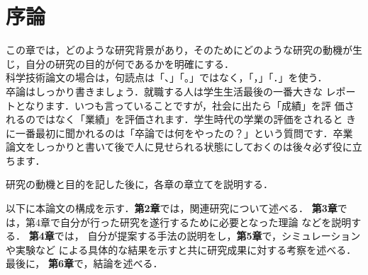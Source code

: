 \chapter{序論}

この章では，どのような研究背景があり，そのためにどのような研究の動機が生
じ，自分の研究の目的が何であるかを明確にする．\\

科学技術論文の場合は，句読点は「、」「。」ではなく，「，」「．」を使う．
\\

卒論はしっかり書きましょう．就職する人は学生生活最後の一番大きな
レポートとなります．いつも言っていることですが，社会に出たら「成績」を評
価されるのではなく「業績」を評価されます．学生時代の学業の評価をされると
きに一番最初に聞かれるのは「卒論では何をやったの？」という質問です．卒業
論文をしっかりと書いて後で人に見せられる状態にしておくのは後々必ず役に立
ちます．\\

\vspace{2cm}

研究の動機と目的を記した後に，各章の章立てを説明する．

\vspace{1cm}
以下に本論文の構成を示す．{\bf 第2章}では，関連研究について述べる．
{\bf 第3章}では，第4章で自分が行った研究を遂行するために必要となった理論
などを説明する．
{\bf 第4章}では，
自分が提案する手法の説明をし，{\bf 第5章}で，シミュレーションや実験など
による具体的な結果を示すと共に研究成果に対する考察を述べる．最後に，{\bf
第6章}で，結論を述べる．

